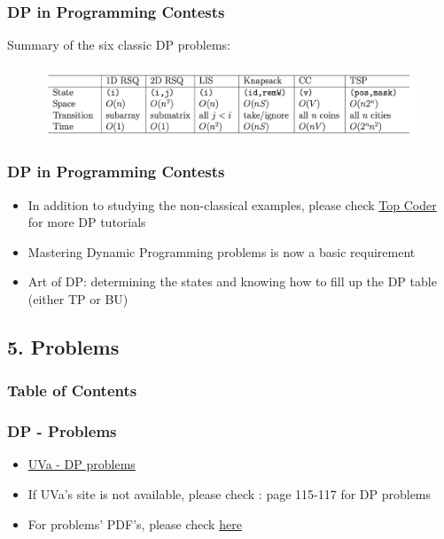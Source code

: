 \documentclass{beamer}
\begin{document}
\begin{frame}[fragile]
\frametitle{DP in Programming Contests}

Summary of the six classic DP problems:

\begin{figure}
    \centering
    \includegraphics[scale=0.45]{imgs/classical_DP_problems.png}
\end{figure}

\end{frame}

\begin{frame}
\frametitle{DP in Programming Contests}

\begin{itemize}
    \item In addition to studying the non-classical examples, please check \href{https://www.topcoder.com/thrive/search?tags[]=Competitive\%20Programming\%20Tutorials}{Top Coder} for more DP tutorials 
    \item Mastering Dynamic Programming problems is now a basic requirement
    \item Art of DP: determining the states and knowing how to fill up the DP table (either TP or BU)
\end{itemize}

\end{frame}


\subsection{5. Problems}
\begin{frame}
	\frametitle{Table of Contents}
\end{frame}

\begin{frame}[fragile]
\frametitle{DP - Problems}

\begin{itemize}
    \item \href{https://onlinejudge.org/index.php?option=com_onlinejudge&Itemid=8&category=648}{UVa - DP problems}
    \item If UVa's site is not available, please check \cite{Halim}: page 115-117 for DP problems
    \item For problems' PDF's, please check \href{https://cpbook.net/methodstosolve?oj=both&topic=ch3&quality=all}{here}
\end{itemize}

\end{frame}
\end{document}
